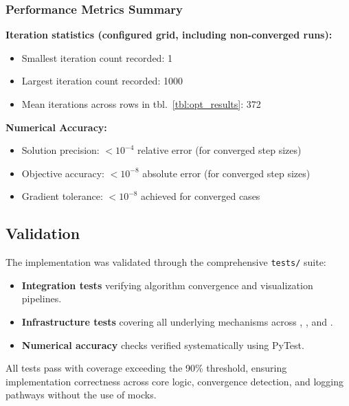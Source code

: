 \documentclass[
  english,
]{article}
\providecommand{\tightlist}{%
  \setlength{\itemsep}{0pt}\setlength{\parskip}{0pt}}
\begin{document}
\subsubsection{Performance Metrics
Summary}\label{performance-metrics-summary}

\textbf{Iteration statistics (configured grid, including non-converged
runs):}

\begin{itemize}
\tightlist
\item
  Smallest iteration count recorded: 1
\item
  Largest iteration count recorded: 1000
\item
  Mean iterations across rows in tbl.~\ref{tbl:opt_results}: 372
\end{itemize}

\textbf{Numerical Accuracy:}

\begin{itemize}
\tightlist
\item
  Solution precision: \(< 10^{-4}\) relative error (for converged step
  sizes)
\item
  Objective accuracy: \(< 10^{-8}\) absolute error (for converged step
  sizes)
\item
  Gradient tolerance: \(< 10^{-8}\) achieved for converged cases
\end{itemize}

\subsection{Validation}\label{validation}

The implementation was validated through the comprehensive
\texttt{tests/} suite:

\begin{itemize}
\tightlist
\item
  \textbf{Integration tests} verifying algorithm convergence and
  visualization pipelines.
\item
  \textbf{Infrastructure tests} covering all underlying mechanisms
  across ,
  , and
  .
\item
  \textbf{Numerical accuracy} checks verified systematically using
  PyTest.
\end{itemize}

All tests pass with coverage exceeding the 90\% threshold, ensuring
implementation correctness across core logic, convergence detection, and
logging pathways without the use of mocks.
\end{document}
